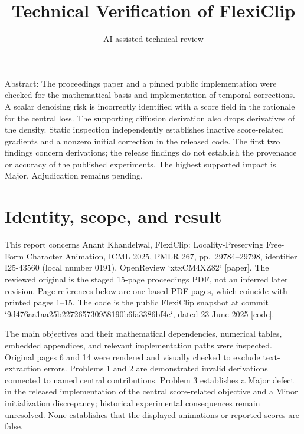 \documentclass[10pt]{article}
\title{Technical Verification of FlexiClip}
\author{AI-assisted technical review}
\date{}
\begin{document}
\maketitle
Abstract: The proceedings paper and a pinned public implementation were checked for the mathematical basis and implementation of temporal corrections. A scalar denoising risk is incorrectly identified with a score field in the rationale for the central loss. The supporting diffusion derivation also drops derivatives of the density. Static inspection independently establishes inactive score-related gradients and a nonzero initial correction in the released code. The first two findings concern derivations; the release findings do not establish the provenance or accuracy of the published experiments. The highest supported impact is Major. Adjudication remains pending.\par
\section*{Identity, scope, and result}
This report concerns Anant Khandelwal, FlexiClip: Locality-Preserving Free-Form Character Animation, ICML 2025, PMLR 267, pp. 29784–29798, identifier I25-43560 (local number 0191), OpenReview `xtxCM4XZ82` [paper]. The reviewed original is the staged 15-page proceedings PDF, not an inferred later revision. Page references below are one-based PDF pages, which coincide with printed pages 1–15. The code is the public FlexiClip snapshot at commit `9d476aa1aa25b227265730958190b6fa3386bf4e`, dated 23 June 2025 [code].\par
The main objectives and their mathematical dependencies, numerical tables, embedded appendices, and relevant implementation paths were inspected. Original pages 6 and 14 were rendered and visually checked to exclude text-extraction errors. Problems 1 and 2 are demonstrated invalid derivations connected to named central contributions. Problem 3 establishes a Major defect in the released implementation of the central score-related objective and a Minor initialization discrepancy; historical experimental consequences remain unresolved. None establishes that the displayed animations or reported scores are false.\par
\end{document}
